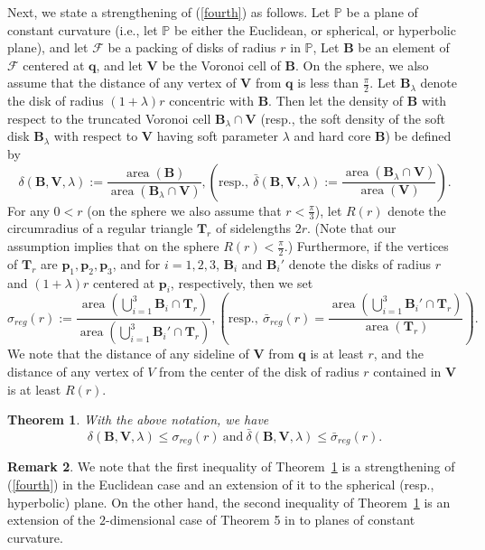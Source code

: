 \documentclass[11pt]{amsart}
\newcommand{\BB}{\mathbf{B}}
\newcommand{\PPP}{\mathbb{P}}
\newcommand{\F}{\mathcal{F}}
\newcommand{\q}{\mathbf{q}}
\newcommand{\p}{\mathbf{p}}
\newcommand{\VV}{\mathbf{V}}
\newcommand{\TT}{\mathbf{T}}
\DeclareMathOperator{\area}{area}
\newtheorem{theorem}{Theorem}[section]
\theoremstyle{definition}
\newtheorem{remark}[theorem]{Remark}
\numberwithin{equation}{section}
\begin{document}
Next, we state a strengthening of (\ref{fourth}) as follows.
Let $\PPP$ be a plane of constant curvature (i.e., let $\PPP$ be either the Euclidean, or spherical, or hyperbolic plane), and let $\F$ be a packing of disks of radius $r$ in $\PPP$, Let $\BB$ be an element of $\F$ centered at $\q$, and let $\VV$ be the Voronoi cell of $\BB$. On the sphere, we also assume that the distance of any vertex of $\VV$ from $\q$ is less than $\frac{\pi}{2}$. Let $\BB_{\lambda}$ denote the disk of radius $(1+\lambda) r$ concentric with $\BB$. Then let the density of $\BB$ with respect to the truncated Voronoi cell $\BB_{\lambda} \cap \VV$ \big(resp., the soft density of the soft disk $\BB_{\lambda}$ with respect to $\VV$ having soft parameter $\lambda$ and hard core $\BB$\big) be defined by 
\[
 \delta(\BB,\VV,\lambda) := \frac{\area(\BB)}{\area(\BB_{\lambda} \cap \VV)}, \left(\mathrm{resp.,\ } \bar{\delta} (\BB,\VV,\lambda) := \frac{\area(\BB_{\lambda} \cap \VV)}{\area(\VV)} \right).
\]
For any $0 < r$ (on the sphere we also assume that $r < \frac{\pi}{3}$), let $R(r)$ denote the circumradius of a regular triangle $\TT_r$ of sidelengths $2r$. (Note that our assumption implies that on the sphere $R(r) < \frac{\pi}{2}$.)
Furthermore, if the vertices of $\TT_r$ are $\p_1,\p_2,\p_3$, and for $i=1,2,3$, $\BB_i$ and $\BB_i'$ denote the disks of radius $r$ and $(1+\lambda)r$ centered at $\p_i$, respectively, then we set
\[
\sigma_{reg}(r) := \frac{\area \left( \bigcup_{i=1}^3 \BB_i \cap \TT_r \right)}{\area\left( \bigcup_{i=1}^3 \BB_i' \cap \TT_r \right)},
\left(\mathrm{resp., \ } \bar{\sigma}_{reg}(r) = \frac{\area\left( \bigcup_{i=1}^3 \BB_i' \cap \TT_r \right)}{\area\left( \TT_r \right)}\right).
\]
We note that the distance of any sideline of $\VV$ from $\q$ is at least $r$, and the distance of any vertex of $V$ from the center of the disk of radius $r$ contained in $\VV$ is at least $R(r)$.

\begin{theorem}\label{thm:planeVoronoi}
With the above notation, we have
\[
\delta(\BB,\VV,\lambda) \leq \sigma_{reg}(r) {\mathrm{\ and\ }} \bar{\delta}(\BB,\VV,\lambda) \leq \bar{\sigma}_{reg}(r).
\]
\end{theorem}

\begin{remark}
We note that the first inequality of Theorem~\ref{thm:planeVoronoi} is a strengthening of (\ref{fourth}) in the Euclidean case and an extension of it to the spherical (resp., hyperbolic) plane. On the other hand, the second inequality of Theorem~\ref{thm:planeVoronoi} is an extension of the $2$-dimensional case of Theorem 5 in \cite{Be-La-2015} to planes of constant curvature.
\end{remark}
\end{document}

